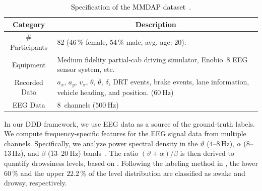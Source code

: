 \documentclass[letterpaper, 10 pt, conference]{ieeeconf}  %
\newcommand{\Review}[1]{\textcolor{black}{#1}}
\begin{document}
\begin{table}[t]
\centering
\caption{\Review{Specification of the MMDAP dataset~\cite{Aygun2024}.}}
\label{tab:dataset}
\begin{tabular}{|c|m{}|} %
    \hline
    \multicolumn{1}{|c|}{\textbf{Category}} & \multicolumn{1}{c|}{\textbf{Description}} \\
    \hline
    \hline
    {\# Participants}
    & 82 (46\,\% female, 54\,\% male, avg. age: 20). \\
    \hline
    {Equipment} 
    & Medium fidelity partial-cab driving simulator, Enobio~8 EEG sensor system, etc.
    \\
    \hline
    {Recorded Data}
    & $a_x$, $a_y$, $v_x$, $\theta$, $\dot{\theta}$, $\delta$, DRT events, 
    brake events, 
    lane information, vehicle heading, and position. 
    ($60~\mathrm{Hz}$)
    \\
    \hline
    {EEG Data} 
    & 8~channels ($500~\mathrm{Hz}$)%
    \\
    \hline
\end{tabular}
\end{table}

    
In our DDD framework, we use EEG data as a source of the ground-truth labels.
{We compute frequency-specific features for the EEG signal data from multiple channels.
Specifically, we analyze power spectral density in the $\vartheta$ ($4$--$8\,\mathrm{Hz}$), $\alpha$ ($8$--$13\,\mathrm{Hz}$), and $\beta$ ($13$--$20~\mathrm{Hz}$) bands~\cite{Horne2004}.
The ratio $(\vartheta+\alpha)/\beta$ is then derived to quantify drowsiness levels, based on \cite{Jap2009}. 
Following the labeling method in \cite{Arefnezhad2019}, the lower $60\,\%$ and the upper $22.2\,\%$ of the level distribution are classified as awake and drowsy, respectively.
}
    
\end{document}
